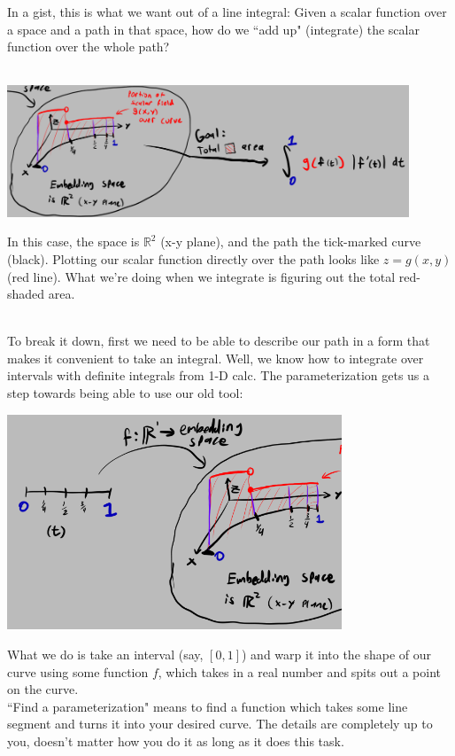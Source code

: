 \documentclass{article}
\newcommand{\R}{\mathbb{R}}
\begin{document}
\begin{flushleft}
{In a gist, this is what we want out of a line integral: Given a scalar function over a space and a path in that space, how do we ``add up" (integrate) the scalar function over the whole path?\\\ 
\begin{center}
	\includegraphics[width=12cm]{int}
\end{center}
In this case, the space is $\R^2$ (x-y plane), and the path the tick-marked curve (black). Plotting our scalar function directly over the path looks like $z = g(x,y)$ (red line). What we're doing when we integrate is figuring out the total red-shaded area.\\\ 

To break it down, first we need to be able to describe our path in a form that makes it convenient to take an integral. Well, we know how to integrate over intervals with definite integrals from 1-D calc. The parameterization gets us a step towards being able to use our old tool:
\begin{center}
	\includegraphics[width=10cm]{line}
\end{center}
What we do is take an interval (say, $[0,1]$) and warp it into the shape of our curve using some function $f$, which takes in a real number and spits out a point on the curve.\\ ``Find a parameterization" means to find a function which takes some line segment and turns it into your desired curve. The details are completely up to you, doesn't matter how you do it as long as it does this task.\\\ 

}
\end{flushleft}
\end{document}
